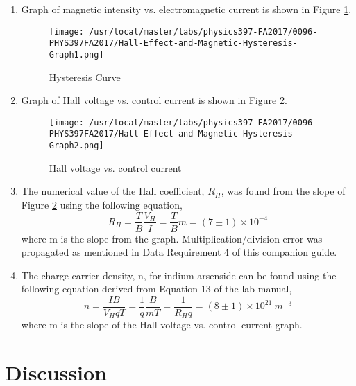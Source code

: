 \begin{enumerate}[resume]
\item Graph of magnetic intensity vs. electromagnetic current is shown in Figure \ref{fig:HMGraph1}.
\begin{figure}[!ht]
\center
\texttt{[image: /usr/local/master/labs/physics397-FA2017/0096-PHYS397FA2017/Hall-Effect-and-Magnetic-Hysteresis-Graph1.png]}
\caption{Hysteresis Curve}
\label{fig:HMGraph1}
\end{figure}

\item Graph of Hall voltage vs. control current is shown in Figure \ref{fig:HMGraph2}.
\begin{figure}[!ht]
\center
\texttt{[image: /usr/local/master/labs/physics397-FA2017/0096-PHYS397FA2017/Hall-Effect-and-Magnetic-Hysteresis-Graph2.png]}
\caption{Hall voltage vs. control current}
\label{fig:HMGraph2}
\end{figure}

\item The numerical value of the Hall coefficient, $R_H$, was found from the slope of Figure \ref{fig:HMGraph2} using the following equation,
$$
R_H=\frac{T}{B}\frac{V_H}{I}=\frac{T}{B}m = (7\pm1)\times10^{-4}
$$
where m is the slope from the graph. Multiplication/division error was propagated as mentioned in Data Requirement 4 of this companion guide.

\item The charge carrier density, n, for indium arsenside can be found using the following equation derived from Equation 13 of the lab manual,
$$
n=\frac{IB}{V_HqT}=\frac{1}{q}\frac{B}{mT}=\frac{1}{R_Hq}=(8\pm1)\times10^{21}\ m^{-3}
$$
where m is the slope of the Hall voltage vs. control current graph.
\end{enumerate}

\section{Discussion}

